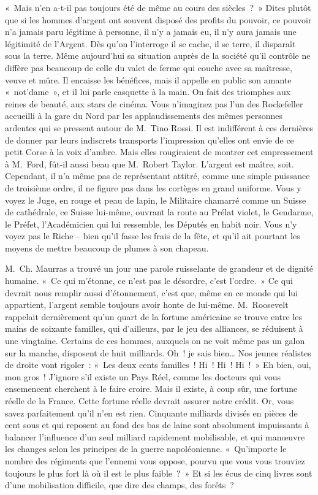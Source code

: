 \documentclass[french,twoside]{book} %
\begin{document}
\noindent « Mais n’en a-t-il pas toujours été de même au cours des siècles ? » Dites plutôt que si les hommes d’argent ont souvent disposé des profits du pouvoir, ce pouvoir n’a jamais paru légitime à personne, il n’y a jamais eu, il n’y aura jamais une légitimité de l’Argent. Dès qu’on l’interroge il se cache, il se terre, il disparaît sous la terre. Même aujourd’hui sa situation auprès de la société qu’il contrôle ne diffère pas beaucoup de celle du valet de ferme qui couche avec sa maîtresse, veuve et mûre. Il encaisse les bénéfices, mais il appelle en public son amante « not’dame », et il lui parle casquette à la main. On fait des triomphes aux reines de beauté, aux stars de cinéma. Vous n’imaginez pas l’un des Rockefeller accueilli à la gare du Nord par les applaudissements des mêmes personnes ardentes qui se pressent autour de M. Tino Rossi. Il est indifférent à ces dernières de donner par leurs indiscrets transports l’impression qu’elles ont envie de ce petit Corse à la voix d’ambre. Mais elles rougiraient de montrer cet empressement à M. Ford, fût-il aussi beau que M. Robert Taylor. L’argent est maître, soit. Cependant, il n’a même pas de représentant attitré, comme une simple puissance de troisième ordre, il ne figure pas dans les cortèges en grand uniforme. Vous y voyez le Juge, en rouge et peau de lapin, le Militaire chamarré comme un Suisse de cathédrale, ce Suisse lui-même, ouvrant la route au Prélat violet, le Gendarme, le Préfet, l’Académicien qui lui ressemble, les Députés en habit noir. Vous n’y voyez pas le Riche – bien qu’il fasse les frais de la fête, et qu’il ait pourtant les moyens de mettre beaucoup de plumes à son chapeau.\par
M. Ch. Maurras a trouvé un jour une parole ruisselante de grandeur et de dignité humaine. « Ce qui m’étonne, ce n’est pas le désordre, c’est l’ordre. » Ce qui devrait nous remplir aussi d’étonnement, c’est que, même en ce monde qui lui appartient, l’argent semble toujours avoir honte de lui-même. M. Roosevelt rappelait dernièrement qu’un quart de la fortune américaine se trouve entre les mains de soixante familles, qui d’ailleurs, par le jeu des alliances, se réduisent à une vingtaine. Certains de ces hommes, auxquels on ne voit même pas un galon sur la manche, disposent de huit milliards. Oh ! je sais bien… Nos jeunes réalistes de droite vont rigoler : « Les deux cents familles ! Hi ! Hi ! Hi ! » Eh bien, oui, mon gros ! J’ignore s’il existe un Pays Réel, comme les docteurs qui vous ensemencent cherchent à le faire croire. Mais il existe, à coup sûr, une fortune réelle de la France. Cette fortune réelle devrait assurer notre crédit. Or, vous savez parfaitement qu’il n’en est rien. Cinquante milliards divisés en pièces de cent sous et qui reposent au fond des bas de laine sont absolument impuissants à balancer l’influence d’un seul milliard rapidement mobilisable, et qui manœuvre les changes selon les principes de la guerre napoléonienne. « Qu’importe le nombre des régiments que l’ennemi vous oppose, pourvu que vous vous trouviez toujours le plus fort là où il est le plus faible ? » Et si les écus de cinq livres sont d’une mobilisation difficile, que dire des champs, des forêts ?\par
\end{document}
